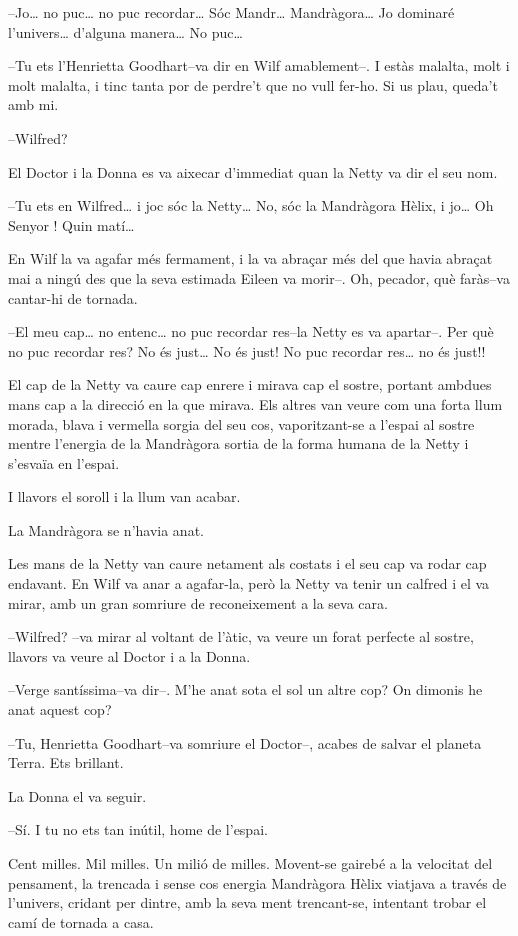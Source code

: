 --Jo\ldots{} no puc\ldots{} no puc recordar\ldots{} Sóc Mandr\ldots{}
Mandràgora\ldots{} Jo dominaré l'univers\ldots{} d'alguna manera\ldots{}
No puc\ldots{}

--Tu ets l'Henrietta Goodhart--va dir en Wilf amablement--. I estàs
malalta, molt i molt malalta, i tinc tanta por de perdre't que no vull
fer-ho. Si us plau, queda't amb mi.

--Wilfred?

El Doctor i la Donna es va aixecar d'immediat quan la Netty va dir el
seu nom.

--Tu ets en Wilfred\ldots{} i joc sóc la Netty\ldots{} No, sóc la
Mandràgora Hèlix, i jo\ldots{} Oh Senyor ! Quin matí\ldots{}

En Wilf la va agafar més fermament, i la va abraçar més del que havia
abraçat mai a ningú des que la seva estimada Eileen va morir--. Oh,
pecador, què faràs--va cantar-hi de tornada.

--El meu cap\ldots{} no entenc\ldots{} no puc recordar res--la Netty es
va apartar--. Per què no puc recordar res? No és just\ldots{} No és
just! No puc recordar res\ldots{} no és just!!

El cap de la Netty va caure cap enrere i mirava cap el sostre, portant
ambdues mans cap a la direcció en la que mirava. Els altres van veure
com una forta llum morada, blava i vermella sorgia del seu cos,
vaporitzant-se a l'espai al sostre mentre l'energia de la Mandràgora
sortia de la forma humana de la Netty i s'esvaïa en l'espai. ~

I llavors el soroll i la llum van acabar.

La Mandràgora se n'havia anat.

Les mans de la Netty van caure netament als costats i el seu cap va
rodar cap endavant. En Wilf va anar a agafar-la, però la Netty va tenir
un calfred i el va mirar, amb un gran somriure de reconeixement a la
seva cara.

--Wilfred? --va mirar al voltant de l'àtic, va veure un forat perfecte
al sostre, llavors va veure al Doctor i a la Donna.

--Verge santíssima--va dir--. M'he anat sota el sol un altre cop? On
dimonis he anat aquest cop?

--Tu, Henrietta Goodhart--va somriure el Doctor--, acabes de salvar el
planeta Terra. Ets brillant.

La Donna el va seguir.

--Sí. I tu no ets tan inútil, home de l'espai.

Cent milles. Mil milles. Un milió de milles. Movent-se gairebé a la
velocitat del pensament, la trencada i sense cos energia Mandràgora
Hèlix viatjava a través de l'univers, cridant per dintre, amb la seva
ment trencant-se, intentant trobar el camí de tornada a casa.

